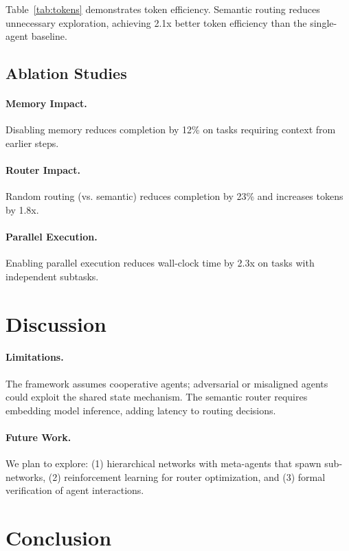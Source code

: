 \documentclass[11pt,twocolumn]{article}
\begin{document}
Table~\ref{tab:tokens} demonstrates token efficiency. Semantic routing reduces unnecessary exploration, achieving 2.1x better token efficiency than the single-agent baseline.

\subsection{Ablation Studies}

\paragraph{Memory Impact.} Disabling memory reduces completion by 12\% on tasks requiring context from earlier steps.

\paragraph{Router Impact.} Random routing (vs. semantic) reduces completion by 23\% and increases tokens by 1.8x.

\paragraph{Parallel Execution.} Enabling parallel execution reduces wall-clock time by 2.3x on tasks with independent subtasks.

\section{Discussion}

\paragraph{Limitations.} The framework assumes cooperative agents; adversarial or misaligned agents could exploit the shared state mechanism. The semantic router requires embedding model inference, adding latency to routing decisions.

\paragraph{Future Work.} We plan to explore: (1) hierarchical networks with meta-agents that spawn sub-networks, (2) reinforcement learning for router optimization, and (3) formal verification of agent interactions.

\section{Conclusion}
\end{document}
